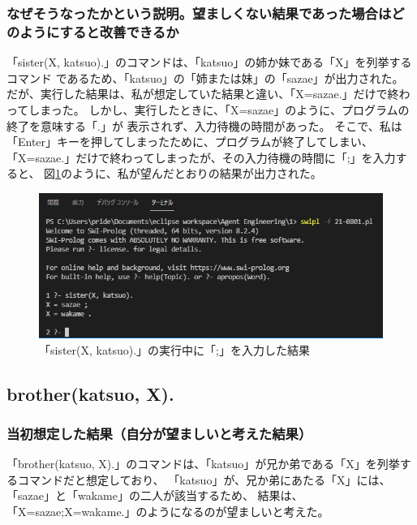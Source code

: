 \subsubsection{なぜそうなったかという説明。望ましくない結果であった場合はどのようにすると改善できるか}
「sister(X, katsuo).」のコマンドは、「katsuo」の姉か妹である「X」を列挙するコマンド
であるため、「katsuo」の「姉または妹」の「sazae」が出力された。
だが、実行した結果は、私が想定していた結果と違い、「X=sazae.」だけで終わってしまった。
しかし、実行したときに、「X=sazae」のように、プログラムの終了を意味する「.」が
表示されず、入力待機の時間があった。
そこで、私は「Enter」キーを押してしまったために、プログラムが終了してしまい、
「X=sazae.」だけで終わってしまったが、その入力待機の時間に「;」を入力すると、
図\ref{graph:1s}のように、私が望んだとおりの結果が出力された。
\begin{figure}[hbtp]
  \centering
  \caption{「sister(X, katsuo).」の実行中に「;」を入力した結果}
  \label{graph:1s}
  \includegraphics[scale = 0.7]{21-0801-01s.png}
\end{figure}
\clearpage

\subsection{brother(katsuo, X).}
\subsubsection{当初想定した結果（自分が望ましいと考えた結果）}
「brother(katsuo, X).」のコマンドは、「katsuo」が兄か弟である「X」を列挙するコマンドだと想定しており、
「katsuo」が、兄か弟にあたる「X」には、「sazae」と「wakame」の二人が該当するため、
結果は、「X=sazae;X=wakame.」のようになるのが望ましいと考えた。

